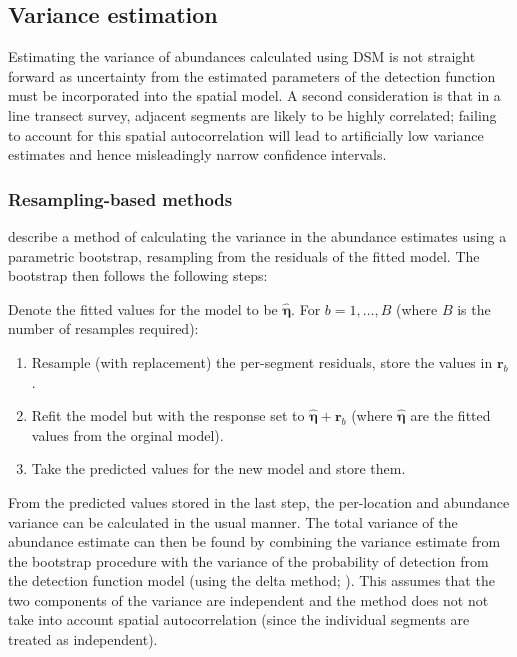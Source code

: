 \documentclass[a4paper,12pt]{article}
\begin{document}
\subsection*{Variance estimation}

Estimating the variance of abundances calculated using DSM is not straight forward as uncertainty from the estimated parameters of the detection function must be incorporated into the spatial model. A second consideration is that in a line transect survey, adjacent segments are likely to be highly correlated; failing to account for this spatial autocorrelation will lead to artificially low variance estimates and hence misleadingly narrow confidence intervals.

\subsubsection*{Resampling-based methods}

\cite{Hedley:2004et} describe a method of calculating the variance in the abundance estimates using a parametric bootstrap, resampling from the residuals of the fitted model. The bootstrap then follows the following steps:

Denote the fitted values for the model to be $\hat{\bm{\eta}}$. For $b=1,\ldots,B$ (where $B$ is the number of resamples required):
\begin{enumerate}
	\item Resample (with replacement) the per-segment residuals, store the values in $\mathbf{r}_{b}$.
	\item Refit the model but with the response set to $\hat{\bm{\eta}}+\mathbf{r}_{b}$ (where $\hat{\bm{\eta}}$ are the fitted values from the orginal model).
	\item Take the predicted values for the new model and store them.
\end{enumerate}
From the predicted values stored in the last step, the per-location and abundance variance can be calculated in the usual manner. The total variance of the abundance estimate can then be found by combining the variance estimate from the bootstrap procedure with the variance of the probability of detection from the detection function model (using the delta method; \cite{Seber:2002ti}). This assumes that the two components of the variance are independent and the method does not not take into account spatial autocorrelation (since the individual segments are treated as independent).
\end{document}
